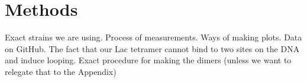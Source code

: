 \pagebreak
\section*{Methods }

Exact strains we are using. Process of measurements. Ways of making plots. Data on GitHub. The fact that our Lac tetramer cannot bind to two sites on the DNA and induce looping. Exact procedure for making the dimers (unless we want to relegate that to the Appendix)